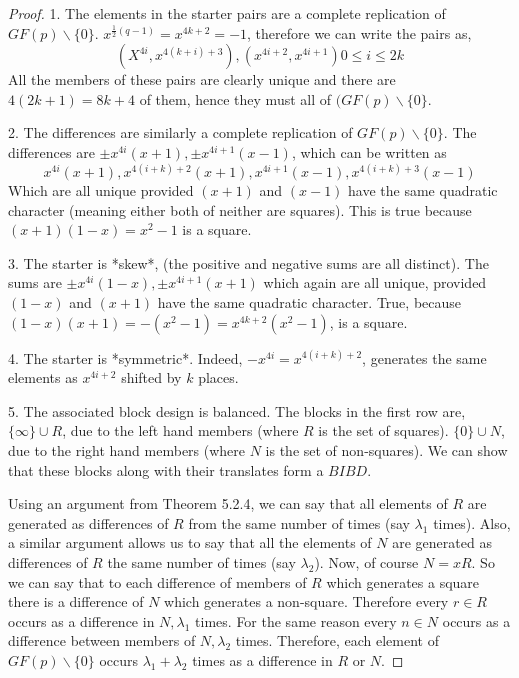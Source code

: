 \documentclass[
  11pt,
  a4paper]{book}
\begin{document}
\begin{proof}
1.  The elements in the starter pairs are a complete
    replication of $GF(p) \backslash \{0\}$.
    $x^{\frac{1}{2} (q - 1)} = x^{4k + 2} = -1$, therefore we
    can write the pairs as,
    $$(X^{4i}, x^{4(k + i) + 3}), (x^{4i + 2}, x^{4i + 1}) 0 \leq i \leq 2k$$
    All the members of these pairs are clearly unique and
    there are $4(2k + 1) = 8k + 4$ of them, hence they must all of
    $(GF(p) \backslash \{0\}$.

2.  The differences are similarly a complete replication of
    $GF(p) \backslash \{0\}$. The differences are
    $\pm x^{4i}(x + 1), \pm x^{4i + 1}(x - 1)$, which can be written
    as
    $$x^{4i}(x + 1), x^{4(i + k) + 2}(x + 1), x^{4i + 1}(x - 1), x^{4(i + k) + 3}(x-1)$$
    Which are all unique provided $(x + 1)$ and $(x - 1)$ have
    the same quadratic character (meaning either both of
    neither are squares).  This is true because
    $(x + 1)(1 - x) = x^2 - 1$ is a square.

3.  The starter is *skew*, (the positive and negative sums
    are all distinct).  The sums are
    $\pm x^{4i}(1 - x), \pm x^{4i + 1}(x + 1)$
    which again are all unique, provided
    $(1 - x)$ and $(x + 1)$ have the same quadratic
    character.  True, because
    $(1 - x)(x  +1) = -(x^2 - 1) = x^{4k + 2}(x^2  -1)$, is a square.

4.  The starter is *symmetric*.
    Indeed, $-x^{4i} = x^{4(i + k) + 2}$, generates the
    same elements as $x^{4i + 2}$ shifted by $k$ places.

5.  The associated block design is balanced.  The blocks in
    the first row are, $\{\infty\} \cup R$, due to the left
    hand members (where $R$ is the set of squares).
    $\{0\} \cup N$, due to the right hand members (where
    $N$ is the set of non-squares).
    We can show that these blocks along with their translates
    form a $BIBD$.
    
    Using an argument from Theorem 5.2.4, we can say that
    all elements of $R$ are generated as differences of $R$
    from the same number of times (say $\lambda _1$ times).
    Also, a similar argument allows us to say that all the
    elements of $N$ are generated as differences of $R$ the
    same number of times (say $\lambda _2$). Now, of course
    $N = xR$. So we can say that to each difference of
    members of $R$ which generates a square there is a
    difference of $N$ which generates a non-square.
    Therefore every $r \in R$ occurs as a difference in
    $N, \lambda _1$ times. For the same reason every
    $n \in N$ occurs as a difference between members of
    $N, \lambda _2$ times. Therefore, each element of
    $GF(p) \backslash \{0\}$ occurs $\lambda _1 + \lambda _2$
    times as a difference in $R$ or $N$.
    

\end{proof}
\end{document}
